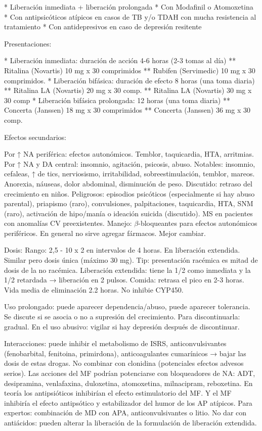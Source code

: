 \documentclass{scrbook}
\begin{document}
* Liberación inmediata + liberación prolongada
* Con Modafinil o Atomoxetina
* Con antipsicóticos atípicos en casos de TB y/o TDAH con mucha resistencia al tratamiento
* Con antidepresivos en caso de depresión resitente

Presentaciones:

* Liberación inmediata: duración de acción 4-6 horas (2-3 tomas al día)
** Ritalina (Novartis) 10 mg x 30 comprimidos
** Rubifen (Servimedic) 10 mg x 30 comprimidos.
* Liberación bifásica: duración de efecto 8 horas (una toma diaria)
** Ritalina LA (Novartis) 20  mg x 30 comp.
** Ritalina LA (Novartis) 30 mg x 30 comp
* Liberación bifásica  prolongada: 12 horas (una toma diaria)
** Concerta (Janssen) 18 mg x 30 comprimidos
** Concerta (Janssen) 36 mg x 30 comp.

Efectos secundarios:

Por ↑ NA periférica: efectos autonómicos. Temblor, taquicardia, HTA, arritmias.
Por ↑ NA y DA central: insomnio, agitación, psicosis, abuso.
Notables: insomnio, cefaleas, ↑ de tics, nerviosismo, irritabilidad, sobreestimulación, temblor, mareos. Anorexia, náuseas, dolor abdominal, disminución de peso. Discutido: retraso del crecimiento en niños.
Peligrosos: episodios psicóticos (especialmente si hay abuso parental), priapismo (raro), convulsiones, palpitaciones, taquicardia, HTA, SNM (raro), activación de hipo/manía o ideación suicida (discutido). MS en pacientes con anomalías CV preexistentes.
Manejo: $\beta$-bloqueantes para efectos autonómicos periféricos. En general no sirve agregar fármacos. Mejor cambiar.

Dosis:
Rango: 2,5 - 10 x 2 en intervalos de 4 horas. En liberación extendida. Similar pero dosis única (máximo 30 mg).
Tip: presentación racémica es mitad de dosis de la no racémica. Liberación extendida: tiene la 1/2 como inmediata y la 1/2 retardada → liberación en 2 pulsos. Comida: retrasa el pico en 2-3 horas. Vida media de eliminación 2.2 horas. No inhibie CYP450.

Uso prolongado: puede aparecer dependencia/abuso, puede aparecer tolerancia. Se discute si se asocia o no a supresión del crecimiento. Para discontinuarla: gradual. En el uso abusivo: vigilar si hay depresión después de discontinuar.

Interacciones: puede inhibir el metabolismo de ISRS, anticonvulsivantes (fenobarbital, fenitoina, primirdona), anticoagulantes cumarínicos → bajar las dosis de estas drogas. No combinar con clonidina (potenciales efectos advesos serios). Las acciones del MF podrían potenciarse con bloqueadores de NA: ADT, desipramina, venlafaxina, duloxetina, atomoxetina, milnacipram, reboxetina. En teoría los antipsióticos inhibirían el efecto estimulatorio del MF. Y el MF inhibiría el efecto antipsótico y estabilizador del humor de los AP atípicos.
Para expertos: combinación de MD con APA, anticonvulsivantes o litio.
No dar con antiácidos: pueden alterar la liberación de la formulación de liberación extendida.
\end{document}
